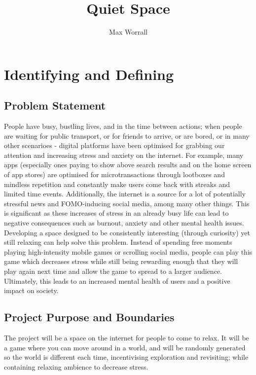 \documentclass[14pt]{article}
\author{Max Worrall}
\title{Quiet Space}
\begin{document}
\maketitle
{}
\tableofcontents
\pagebreak


\section{Identifying and Defining}

\subsection{Problem Statement}
People have busy, bustling lives, and in the time between actions; when people are waiting for public transport, or for friends to arrive, or are bored, or in many other scenarioes - digital platforms have been optimised for grabbing our attention and increasing stress and anxiety on the internet. For example, many apps (especially ones paying to show above search results and on the home screen of app stores) are optimised for microtransactions through lootboxes and mindless repetition and constantly make users come back with streaks and limited time events. Additionally, the internet is a source for a lot of potentially stressful news and FOMO-inducing social media, among many other things.
This is significant as these increases of stress in an already busy life can lead to negative consequences such as burnout, anxiety and other mental health issues. Developing a space designed to be consistently interesting (through curiosity) yet still relaxing can help solve this problem. Instead of spending free moments playing high-intensity mobile games or scrolling social media, people can play this game which decreases stress while still being rewarding enough that they will play again next time and allow the game to spread to a larger audience. Ultimately, this leads to an increased mental health of users and a positive impact on society.

\subsection{Project Purpose and Boundaries}
The project will be a space on the internet for people to come to relax. It will be a game where you can move around in a world, and will be randomly generated so the world is different each time, incentivising exploration and revisiting; while containing relaxing ambience to decrease stress.
\end{document}
